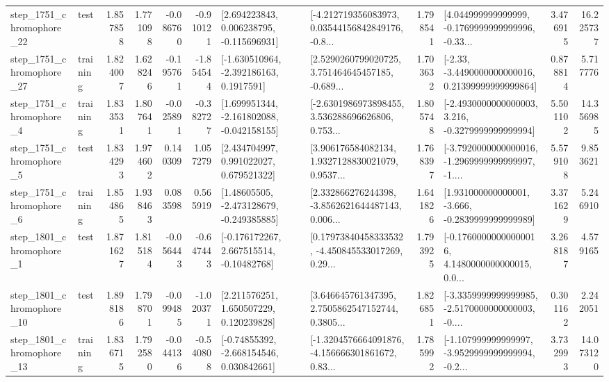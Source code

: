 \begin{tabular}{llrrrrllrlrr}
 step\_1751\_chromophore\_22 &      test &      1.857858 &    1.771098 &     -0.086760 & -0.910121 &    [2.694223843, 0.006238795, -0.115696931] &  [-4.212719356083973, 0.03544156842849176, -0.8... &       1.798541 &  [4.044999999999999, -0.1769999999999996, -0.33... &            3.476915 &         16.225737 \\
 step\_1751\_chromophore\_27 &  training &      1.824007 &    1.628246 &     -0.195761 & -1.854544 &     [-1.630510964, -2.392186163, 0.1917591] &  [2.5290260799020725, 3.751464645457185, -0.689... &       1.703632 &  [-2.33, -3.4490000000000016, 0.21399999999999864] &            0.878814 &          5.717776 \\
  step\_1751\_chromophore\_4 &  training &      1.833531 &    1.807641 &     -0.025891 & -0.382727 &   [1.699951344, -2.161802088, -0.042158155] &  [-2.6301986973898455, 3.536288696626806, 0.753... &       1.805748 &  [-2.4930000000000003, 3.216, -0.3279999999999994] &            5.501102 &         14.356985 \\
  step\_1751\_chromophore\_5 &      test &      1.834293 &    1.974602 &      0.140309 &  1.057279 &     [2.434704997, 0.991022027, 0.679521322] &  [3.906176584082134, 1.9327128830021079, 0.9537... &       1.768397 &  [-3.7920000000000016, -1.2969999999999997, -1.... &            5.579108 &          9.853621 \\
  step\_1751\_chromophore\_6 &  training &      1.854865 &    1.938463 &      0.083598 &  0.565919 &    [1.48605505, -2.473128679, -0.249385885] &  [2.332866276244398, -3.8562621644487143, 0.006... &       1.641826 &   [1.931000000000001, -3.666, -0.2839999999999989] &            3.371629 &          5.246910 \\
  step\_1801\_chromophore\_1 &      test &      1.871627 &    1.815184 &     -0.056443 & -0.647443 &    [-0.176172267, 2.667515514, -0.10482768] &  [0.17973840458333532, -4.450845533017269, 0.29... &       1.793925 &  [-0.17600000000000016, 4.1480000000000015, 0.0... &            3.268187 &          4.579165 \\
 step\_1801\_chromophore\_10 &      test &      1.898186 &    1.798701 &     -0.099485 & -1.020371 &     [2.211576251, 1.650507229, 0.120239828] &  [3.646645761347395, 2.7505862547152744, 0.3805... &       1.826851 &  [-3.3359999999999985, -2.5170000000000003, -0.... &            0.301162 &          2.242051 \\
 step\_1801\_chromophore\_13 &  training &      1.836715 &    1.792580 &     -0.044136 & -0.540808 &    [-0.74855392, -2.668154546, 0.030842661] &  [-1.3204576664091876, -4.156666301861672, 0.83... &       1.785992 &  [-1.107999999999997, -3.9529999999999994, -0.2... &            3.732993 &         14.073120 \\

\end{tabular}

